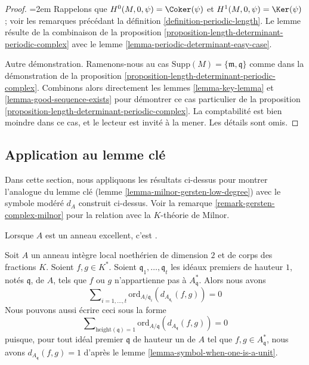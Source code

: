 \begin{proof}
{\emergencystretch=2em Rappelons que $H^0(M, 0, \psi) = \Coker(\psi)$ et
$H^1(M, 0, \psi) = \Ker(\psi)$ ; voir les remarques précédant
la définition \ref{definition-periodic-length}.
Le lemme résulte de la combinaison de la
proposition \ref{proposition-length-determinant-periodic-complex} avec le
lemme \ref{lemma-periodic-determinant-easy-case}.\par}

\medskip\noindent
Autre démonstration. Ramenons-nous au cas
$\text{Supp}(M) = \{\mathfrak m, \mathfrak q\}$
comme dans la démonstration de la
proposition \ref{proposition-length-determinant-periodic-complex}.
Combinons alors directement les
lemmes \ref{lemma-key-lemma} et
\ref{lemma-good-sequence-exists}
pour démontrer ce cas particulier de la
proposition \ref{proposition-length-determinant-periodic-complex}.
La comptabilité est bien moindre dans ce cas, et le lecteur est
invité à la mener. Les détails sont omis.
\end{proof}




\subsection{Application au lemme clé}
\label{subsection-application-tame-symbol}

\noindent
Dans cette section, nous appliquons les résultats ci-dessus pour montrer
l'analogue du lemme clé (lemme \ref{lemma-milnor-gersten-low-degree})
avec le symbole modéré $d_A$ construit ci-dessus. Voir la
remarque \ref{remark-gersten-complex-milnor}
pour la relation avec la $K$-théorie de Milnor.

\begin{lemma}
\label{lemma-secondary-ramification}
\begin{reference}
Lorsque $A$ est un anneau excellent, c'est \cite[Proposition 1]{Kato-Milnor-K}.
\end{reference}
Soit $A$ un anneau intègre local noethérien de dimension $2$ et de corps des fractions $K$.
Soient $f, g \in K^*$.
Soient $\mathfrak q_1, \ldots, \mathfrak q_t$ les idéaux premiers de hauteur
$1$, notés $\mathfrak q$, de $A$, tels que $f$ ou $g$ n'appartienne pas à
$A^*_{\mathfrak q}$.
Alors nous avons
$$
\sum\nolimits_{i = 1, \ldots, t}
\text{ord}_{A/\mathfrak q_i}(d_{A_{\mathfrak q_i}}(f, g))
=
0
$$
Nous pouvons aussi écrire ceci sous la forme
$$
\sum\nolimits_{\text{height}(\mathfrak q) = 1}
\text{ord}_{A/\mathfrak q}(d_{A_{\mathfrak q}}(f, g))
=
0
$$
puisque, pour tout idéal premier $\mathfrak q$ de hauteur un
de $A$ tel que $f, g \in A^*_{\mathfrak q}$,
nous avons $d_{A_{\mathfrak q}}(f, g) = 1$ d'après le
lemme \ref{lemma-symbol-when-one-is-a-unit}.
\end{lemma}

